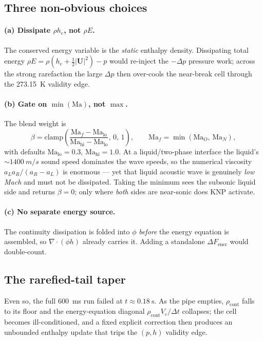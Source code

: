 \documentclass[11pt,a4paper]{article}
\newcommand{\uvec}{\mathbf{U}}
\newcommand{\dt}{\Delta t}
\newcommand{\rhocont}{\rho_{\mathrm{cont}}}
\begin{document}
\subsection{Three non-obvious choices}

\paragraph{(a) Dissipate $\rho h_e$, not $\rho E$.} The conserved energy variable
is the \emph{static} enthalpy density. Dissipating total energy
$\rho E = \rho(h_e + \tfrac12|\uvec|^2) - p$ would re-inject the $-\Delta p$
pressure work; across the strong rarefaction the large $\Delta p$ then over-cools
the near-break cell through the \SI{273.15}{\kelvin} validity edge.

\paragraph{(b) Gate on $\min(\mathrm{Ma})$, not $\max$.} The blend weight is
\begin{equation}
  \beta = \mathrm{clamp}\!\left(\frac{\mathrm{Ma}_f - \mathrm{Ma}_{\mathrm{lo}}}
  {\mathrm{Ma}_{\mathrm{hi}} - \mathrm{Ma}_{\mathrm{lo}}},\,0,\,1\right),
  \qquad
  \mathrm{Ma}_f = \min(\mathrm{Ma}_O,\,\mathrm{Ma}_N),
\end{equation}
with defaults $\mathrm{Ma}_{\mathrm{lo}}=0.3$, $\mathrm{Ma}_{\mathrm{hi}}=1.0$.
At a liquid/two-phase interface the liquid's $\sim\!\SI{1400}{m/s}$ sound speed
dominates the wave speeds, so the numerical viscosity $a_L a_R/(a_R-a_L)$ is
enormous --- yet that liquid acoustic wave is genuinely \emph{low Mach} and must
not be dissipated. Taking the minimum sees the subsonic liquid side and returns
$\beta = 0$; only where \emph{both} sides are near-sonic does KNP activate.

\paragraph{(c) No separate energy source.} The continuity dissipation is folded
into $\phi$ \emph{before} the energy equation is assembled, so
$\nabla\!\cdot\!(\phi h)$ already carries it. Adding a standalone
$\Delta F_{\mathrm{ener}}$ would double-count.

\subsection{The rarefied-tail taper}

Even so, the full \SI{600}{\milli\second} run failed at $t \approx
\SI{0.18}{\second}$. As the pipe empties, $\rhocont$ falls to its floor and the
energy-equation diagonal $\rhocont V_c/\dt$ collapses; the cell becomes
ill-conditioned, and a fixed explicit correction then produces an unbounded
enthalpy update that trips the $(p,h)$ validity edge.
\end{document}
